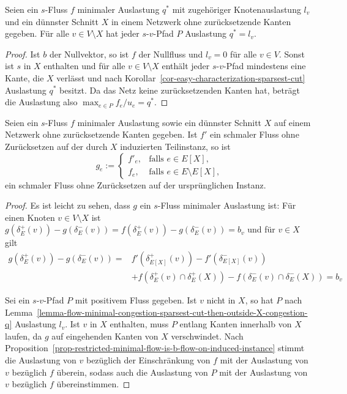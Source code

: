 \begin{lemma}\label{lemma-flow-minimal-congestion-sparsest-cut-then-outside-X-congestion-q}
	Seien ein $s$-Fluss $f$ minimaler Auslastung $q^*$ mit zugehöriger Knotenauslastung $l_v$ und ein dünnster Schnitt $X$ in einem Netzwerk ohne zurücksetzende Kanten gegeben.
	Für alle $v\in V\setminus X$ hat jeder $s$-$v$-Pfad $P$ Auslastung $q^*=l_v$.
\end{lemma}
\begin{proof}
	Ist $b$ der Nullvektor, so ist $f$ der Nullfluss und $l_v = 0$ für alle $v\in V$.
	Sonst ist $s$ in $X$ enthalten und für alle $v\in V\setminus X$ enthält jeder $s$-$v$-Pfad mindestens eine Kante, die $X$ verlässt und nach Korollar~\ref{cor-easy-characterization-sparsest-cut} Auslastung $q^*$ besitzt.
	Da das Netz keine zurücksetzenden Kanten hat, beträgt die Auslastung also $\max_{e\in P} f_e / u_e = q^*$.
\end{proof}

\begin{corollary}
	Seien ein $s$-Fluss $f$ minimaler Auslastung sowie ein dünnster Schnitt $X$ auf einem Netzwerk ohne zurücksetzende Kanten gegeben.
	Ist $f'$ ein schmaler Fluss ohne Zurücksetzen auf der durch $X$ induzierten Teilinstanz, so ist \[
		g_e := \begin{cases}
			f'_e, & \text{falls $e\in E[X]$,} \\
			f_e, & \text{falls $e\in E\setminus E[X]$,}
		\end{cases}
	\] ein schmaler Fluss ohne Zurücksetzen auf der ursprünglichen Instanz.
\end{corollary}
\begin{proof}
	Es ist leicht zu sehen, dass $g$ ein $s$-Fluss minimaler Auslastung ist:
	Für einen Knoten $v \in V\setminus X$ ist $g(\delta^+_E(v)) - g(\delta^-_E(v)) = f(\delta^+_E(v)) - g(\delta^-_E(v)) = b_v$ und für $v\in X$ gilt \begin{align*}
	g(\delta^+_E(v)) - g(\delta^-_E(v)) =& f'(\delta^+_{E[X]}(v))  - f'(\delta^-_{E[X]}(v))  \\
	&+ f(\delta^+_E(v)\cap\delta^+_E(X)) - f(\delta^-_E(v)\cap\delta^-_E(X)) = b_v
	\end{align*}

	
	Sei ein $s$-$v$-Pfad $P$ mit positivem Fluss gegeben.
	Ist $v$ nicht in $X$, so hat $P$ nach Lemma~\ref{lemma-flow-minimal-congestion-sparsest-cut-then-outside-X-congestion-q} Auslastung $l_v$.
	Ist $v$ in $X$ enthalten, muss $P$ entlang Kanten innerhalb von $X$ laufen, da $g$ auf eingehenden Kanten von $X$ verschwindet.
	Nach Proposition~\ref{prop-restricted-minimal-flow-is-b-flow-on-induced-instance} stimmt die Auslastung von $v$ bezüglich der Einschränkung von $f$ mit der Auslastung von $v$ bezüglich $f$ überein, sodass auch die Auslastung von $P$ mit der Auslastung von $v$ bezüglich $f$ übereinstimmen.
\end{proof}


